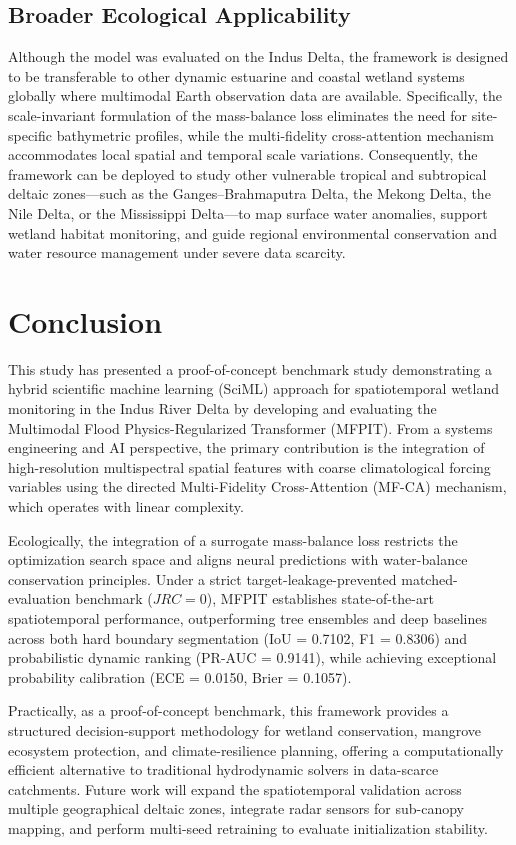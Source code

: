 \documentclass[preprint,12pt]{elsarticle}
\begin{document}
\subsection{Broader Ecological Applicability}
Although the model was evaluated on the Indus Delta, the framework is designed to be transferable to other dynamic estuarine and coastal wetland systems globally where multimodal Earth observation data are available. Specifically, the scale-invariant formulation of the mass-balance loss eliminates the need for site-specific bathymetric profiles, while the multi-fidelity cross-attention mechanism accommodates local spatial and temporal scale variations. Consequently, the framework can be deployed to study other vulnerable tropical and subtropical deltaic zones---such as the Ganges--Brahmaputra Delta, the Mekong Delta, the Nile Delta, or the Mississippi Delta---to map surface water anomalies, support wetland habitat monitoring, and guide regional environmental conservation and water resource management under severe data scarcity.

\section{Conclusion}
This study has presented a proof-of-concept benchmark study demonstrating a hybrid scientific machine learning (SciML) approach for spatiotemporal wetland monitoring in the Indus River Delta by developing and evaluating the Multimodal Flood Physics-Regularized Transformer (MFPIT). From a systems engineering and AI perspective, the primary contribution is the integration of high-resolution multispectral spatial features with coarse climatological forcing variables using the directed Multi-Fidelity Cross-Attention (MF-CA) mechanism, which operates with linear complexity. 

Ecologically, the integration of a surrogate mass-balance loss restricts the optimization search space and aligns neural predictions with water-balance conservation principles. Under a strict target-leakage-prevented matched-evaluation benchmark ($JRC=0$), MFPIT establishes state-of-the-art spatiotemporal performance, outperforming tree ensembles and deep baselines across both hard boundary segmentation (IoU = 0.7102, F1 = 0.8306) and probabilistic dynamic ranking (PR-AUC = 0.9141), while achieving exceptional probability calibration (ECE = 0.0150, Brier = 0.1057). 

Practically, as a proof-of-concept benchmark, this framework provides a structured decision-support methodology for wetland conservation, mangrove ecosystem protection, and climate-resilience planning, offering a computationally efficient alternative to traditional hydrodynamic solvers in data-scarce catchments. Future work will expand the spatiotemporal validation across multiple geographical deltaic zones, integrate radar sensors for sub-canopy mapping, and perform multi-seed retraining to evaluate initialization stability.
\end{document}
